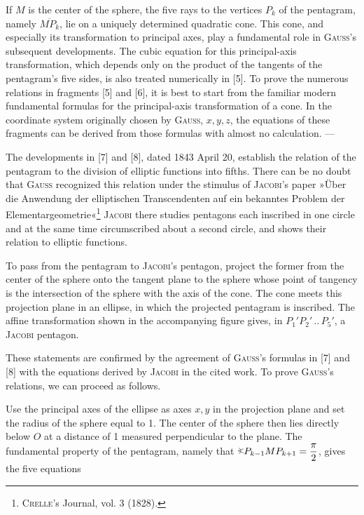 If $M$ is the center of the sphere, the five rays to the vertices $P_k$ of the pentagram,
namely $\overline{MP_k}$, lie on a uniquely determined quadratic cone.
This cone, and especially its transformation to principal axes, play a fundamental role in \textsc{Gauss}'s subsequent
developments. The cubic equation for this principal-axis transformation, which
depends only on the product of the tangents of the pentagram's five sides, is also treated
numerically in [5]. To prove the numerous relations in
fragments [5] and [6], it is best to start from the familiar modern
fundamental formulas for the principal-axis transformation of a cone. In the coordinate system
originally chosen by \textsc{Gauss}, $x, y, z$, the equations of these fragments can be derived from those formulas
with almost no calculation. ---

The developments in [7] and [8], dated 1843 April 20, establish the
relation of the pentagram to the division of elliptic functions into fifths.
There can be no doubt that \textsc{Gauss} recognized this relation under the stimulus of \textsc{Jacobi}'s paper »Über die
Anwendung der elliptischen Transcendenten auf ein bekanntes Problem der
Elementargeometrie«\footnote{\textsc{Crelle}'s Journal, vol. 3 (1828).} \textsc{Jacobi} there studies
pentagons each inscribed in one circle and at the same time circumscribed about a second
circle, and shows their relation to elliptic functions.

To pass from the pentagram to \textsc{Jacobi}'s pentagon, project the
former from the center of the sphere onto the tangent plane to the sphere whose
point of tangency is the intersection of the sphere with the axis of the cone. The cone
meets this projection plane in an ellipse, in which the projected pentagram
is inscribed. The affine transformation shown in the accompanying figure gives,
in $P_1'P_2'\,..\,P_5'$, a \textsc{Jacobi} pentagon.

\begin{center}\end{center}

These statements are confirmed by the agreement of \textsc{Gauss}'s formulas in [7]
and [8] with the equations derived by \textsc{Jacobi} in the cited work. To prove
\textsc{Gauss}'s relations, we can proceed as follows.

Use the principal axes of the ellipse as axes $x, y$ in the projection plane and set the
radius of the sphere equal to 1. The center of the sphere then lies directly below $O$ at a distance of
1 measured perpendicular to the plane. The fundamental property of the pentagram, namely
that $\HistAngle P_{k-1}MP_{k+1} = \dfrac{\pi}{2}$, gives the five equations

